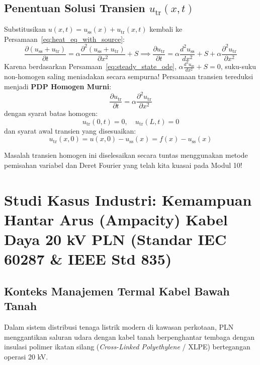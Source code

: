 \documentclass[11pt,a4paper]{article}
\theoremstyle{definition}
\begin{document}
\subsection{Penentuan Solusi Transien \texorpdfstring{$u_{\text{tr}}(x, t)$}{u-tr(x, t)}}
Substitusikan $u(x, t) = u_{\text{ss}}(x) + u_{\text{tr}}(x, t)$ kembali ke Persamaan~\eqref{eq:heat_eq_with_source}:
\begin{equation*}
    \frac{\partial (u_{\text{ss}} + u_{\text{tr}})}{\partial t} = \alpha \frac{\partial^2 (u_{\text{ss}} + u_{\text{tr}})}{\partial x^2} + S \implies \frac{\partial u_{\text{tr}}}{\partial t} = \alpha \frac{d^2 u_{\text{ss}}}{dx^2} + S + \alpha \frac{\partial^2 u_{\text{tr}}}{\partial x^2}
\end{equation*}
Karena berdasarkan Persamaan~\eqref{eq:steady_state_ode}, $\alpha \frac{d^2 u_{\text{ss}}}{dx^2} + S = 0$, suku-suku non-homogen saling meniadakan secara sempurna! Persamaan transien tereduksi menjadi \textbf{PDP Homogen Murni}:
\begin{equation}
    \frac{\partial u_{\text{tr}}}{\partial t} = \alpha \frac{\partial^2 u_{\text{tr}}}{\partial x^2}
    \label{eq:transient_pde_homo}
\end{equation}
dengan syarat batas homogen:
\begin{equation}
    u_{\text{tr}}(0, t) = 0, \quad u_{\text{tr}}(L, t) = 0
\end{equation}
dan syarat awal transien yang disesuaikan:
\begin{equation}
    u_{\text{tr}}(x, 0) = u(x, 0) - u_{\text{ss}}(x) = f(x) - u_{\text{ss}}(x)
    \label{eq:transient_initial_cond}
\end{equation}

Masalah transien homogen ini diselesaikan secara tuntas menggunakan metode pemisahan variabel dan Deret Fourier yang telah kita kuasai pada Modul 10!

\section{Studi Kasus Industri: Kemampuan Hantar Arus (Ampacity) Kabel Daya 20 kV PLN (Standar IEC 60287 \& IEEE Std 835)}

\subsection{Konteks Manajemen Termal Kabel Bawah Tanah}
Dalam sistem distribusi tenaga listrik modern di kawasan perkotaan, PLN menggantikan saluran udara dengan kabel tanah berpenghantar tembaga dengan insulasi polimer ikatan silang (\textit{Cross-Linked Polyethylene} / XLPE) bertegangan operasi 20 kV.
\end{document}
